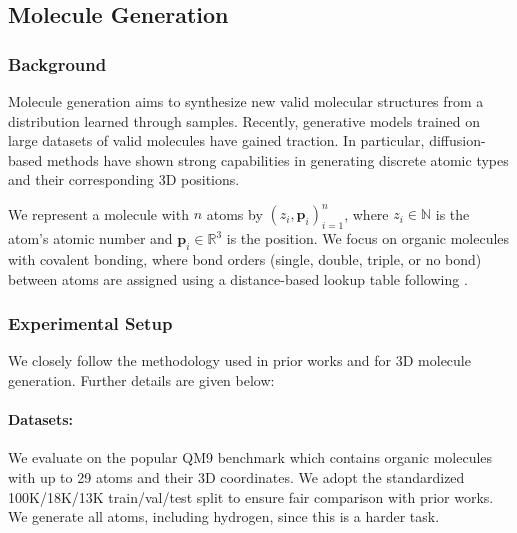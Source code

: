 \subsection{Molecule Generation}

\subsubsection{Background}
Molecule generation aims to synthesize new valid molecular structures from a distribution learned through samples. Recently, generative models trained on large datasets of valid molecules have gained traction. In particular, diffusion-based methods have shown strong capabilities in generating discrete atomic types and their corresponding 3D positions.


We represent a molecule with $n$ atoms by $(z_i, \mathbf{p}_i)_{i=1}^{n}$, where $z_{i} \in \mathbb{N}$ is the atom's atomic number and $\mathbf{p}_i \in \mathbb{R}^{3}$ is the position. We focus on organic molecules with covalent bonding, where bond orders (single, double, triple, or no bond) between atoms are assigned using a distance-based lookup table following \cite{hoogeboom2022equivariant}.

\subsubsection{Experimental Setup}
We closely follow the methodology used in prior works \cite{hua2024mudiff} and \cite{hoogeboom2022equivariant} for 3D molecule generation. Further details are given below:

\paragraph{Datasets:}
We evaluate on the popular QM9 benchmark \cite{ramakrishnan2014quantum} which contains organic molecules with up to 29 atoms and their 3D coordinates. We adopt the standardized 100K/18K/13K train/val/test split to ensure fair comparison with prior works. We generate all atoms, including hydrogen, since this is a harder task.

